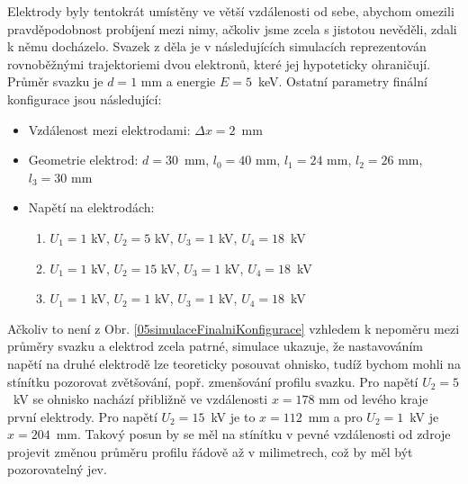 Elektrody byly tentokrát umístěny ve větší vzdálenosti od sebe, abychom omezili pravděpodobnost probíjení mezi nimy, ačkoliv jsme zcela s jistotou nevěděli, zdali k němu docházelo. Svazek z děla je v následujících simulacích reprezentován rovnoběžnými trajektoriemi dvou elektronů, které jej hypoteticky ohraničují. Průměr svazku je $d = 1$ mm a energie $E = 5$~keV. Ostatní parametry finální konfigurace jsou následující:
\begin{itemize}
	\item Vzdálenost mezi elektrodami: $\Delta x = 2$~mm
	\item Geometrie elektrod: $d = 30$~mm, $l_0 = 40$ mm, $l_1 = 24$ mm, $l_2 = 26$ mm, $l_3 = 30$ mm
	\item Napětí na elektrodách:
	\begin{enumerate}
		\item $U_1 = 1$ kV, $U_2 = 5$ kV, $U_3 = 1$ kV, $U_4 = 18$~kV
		\item $U_1 = 1$ kV, $U_2 = 15$ kV, $U_3 = 1$ kV, $U_4 = 18$~kV
		\item $U_1 = 1$ kV, $U_2 = 1$ kV, $U_3 = 1$ kV, $U_4 = 18$~kV
	\end{enumerate}
\end{itemize}

Ačkoliv to není z Obr. \ref{05simulaceFinalniKonfigurace} vzhledem k nepoměru mezi průměry svazku a elektrod zcela patrné, simulace ukazuje, že nastavováním napětí na druhé elektrodě lze teoreticky posouvat ohnisko, tudíž bychom mohli na stínítku pozorovat zvětšování, popř. zmenšování profilu svazku. Pro napětí $U_2 = 5$~kV se ohnisko nachází přibližně ve vzdálenosti $x = 178$ mm od levého kraje první elektrody. Pro napětí $U_2 = 15$~kV je to $x = 112$~mm a pro $U_2 = 1$~kV je $x = 204$~mm. Takový posun by se měl na stínítku v pevné vzdálenosti od zdroje projevit změnou průměru profilu řádově až v milimetrech, což by měl být pozorovatelný jev.\\

